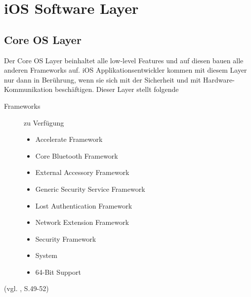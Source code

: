 
\section{iOS Software Layer}
\label{sec:iOSSWLayer}


\subsection{Core OS Layer}
\label{sec:CoreLayer}

Der Core OS Layer beinhaltet alle \glqq low-level\grqq{} Features und auf
diesen bauen alle anderen Frameworks auf. iOS Applikationsentwickler kommen mit
diesem Layer nur dann in Berührung, wenn sie sich mit der Sicherheit und mit
Hardware-Kommunikation beschäftigen. Dieser Layer stellt folgende
\begin{description}
	\item[\glqq Frameworks\grqq{}]zu Verfügung~\par
	\begin{itemize}
		\item Accelerate Framework
		\item Core Bluetooth Framework
		\item External Accessory Framework
		\item Generic Security Service Framework
		\item Lost Authentication Framework
		\item Network Extension Framework
		\item Security Framework
		\item System
		\item 64-Bit Support
	\end{itemize}
\end{description}
 (vgl. \cite{Apple[6]}, S.49-52)
